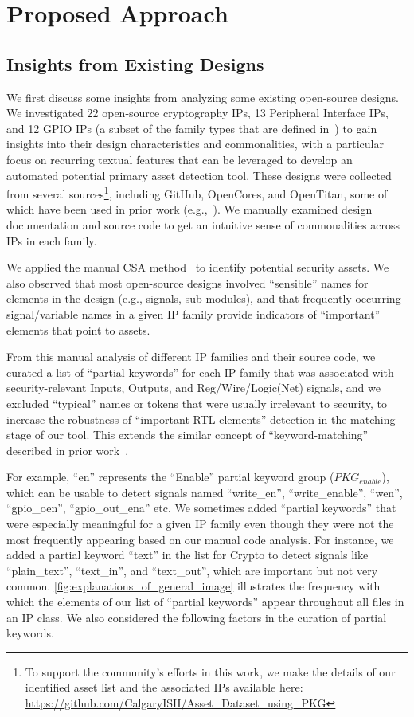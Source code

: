 \section{Proposed Approach\label{sec:proposed}}

\subsection{Insights from Existing Designs\label{ssec:IED}}
We first discuss some insights from analyzing some existing open-source designs. 
We investigated 22 open-source cryptography IPs, 13 Peripheral Interface IPs, and 12 GPIO IPs (a subset of the family types that are defined in~\cite{accellera}) to gain insights into their design characteristics and commonalities, with a particular focus on 
recurring textual features that can be leveraged to develop an automated potential primary asset detection tool. 
These designs were collected from several sources\footnote{%
To support the community's efforts in this work, we make the details of our identified asset list and the associated IPs available here: \url{https://github.com/CalgaryISH/Asset_Dataset_using_PKG}
}, including GitHub, OpenCores, and OpenTitan, some of which have been used in prior work (e.g.,~\cite{Ahmad_2022}).
We manually examined design documentation and source code to get an intuitive sense of commonalities across IPs in each family. 

We applied the manual CSA method~\cite{ieee_p3164_working_group_asset_2024} to identify potential security assets. We also observed that most open-source designs involved ``sensible'' names for elements in the design (e.g., signals, sub-modules), and that frequently occurring signal/variable names in a given IP family provide indicators of ``important'' elements that point to assets. 

From this manual analysis of different \ac{IP} families and their source code, we curated a list of ``partial keywords'' for each \ac{IP} family that was associated with security-relevant Inputs, Outputs, and Reg/Wire/Logic(Net) signals, and we excluded ``typical'' names or tokens that were usually irrelevant to security, to increase the robustness of ``important RTL elements'' detection in the matching stage of our tool. 
This extends the similar concept of ``keyword-matching'' described in prior work~\cite{Ahmad_2022}.

For example, ``en'' represents the ``Enable'' partial keyword group ($PKG_{enable}$), which can be usable to detect signals named ``write\_en'', ``write\_enable'', ``wen'', ``gpio\_oen'', ``gpio\_out\_ena'' etc.
We sometimes added ``partial keywords'' that were especially meaningful for a given IP family even though they were not the most frequently appearing based on our manual code analysis. 
For instance, we added a partial keyword ``text'' in the list for Crypto to detect signals like ``plain\_text'', ``text\_in'', and ``text\_out'', which are important but not very common. 
\autoref{fig:explanations_of_general_image} illustrates the frequency with which the elements of our list of ``partial keywords'' appear throughout all files in an IP class. 
We also considered the following factors in the curation of partial keywords.

